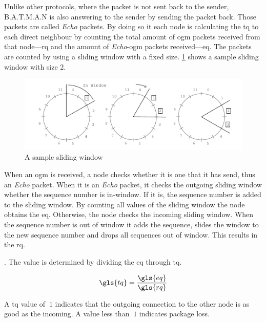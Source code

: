 Unlike other protocols, where the packet is not sent back to the sender, B.A.T.M.A.N is also answering to the sender by sending the packet back. Those packets are called \textit{Echo} packets. By doing so it each node is calculating the \gls{tq} to each direct neighbour by counting the total amount of \gls{ogm} packets received from that node—\gls{rq} and the amount of \textit{Echo}-\gls{ogm} packets received—\gls{eq}. 
The packets are counted by using a sliding window \cite[\S3.4]{tanenbaum_wetherall_2011} with a fixed size. \cref{fig:sliding-window} shows a sample sliding window with size 2. 

\begin{figure}
\centering
\includegraphics[width=1\textwidth]{graphics/sliding-window.pdf}
\caption{A sample sliding window}
\label{fig:sliding-window}
\end{figure}

When an \gls{ogm} is received, a node checks whether it is one that it has send, thus an \textit{Echo} packet. When it is an \textit{Echo} packet, it checks the outgoing sliding window whether the sequence number is in-window. If it is, the sequence number is added to the sliding window. By counting all values of the sliding window the node obtains the \gls{eq}. 
Otherwise, the node checks the incoming sliding window. When the sequence number is out of window it adds the sequence, slides the window to the new sequence number and drops all sequences out of window. This results in the \gls{rq}.

\cite[\S2.3.3]{tobias_hardes}. The value is determined by dividing the \gls{eq} through \gls{tq}.

\begin{equation}
\label{eq:transmit_quality}
\gls{tq} = \frac{\gls{eq}}{\gls{rq}}
\end{equation}

A \gls{tq} value of $\ 1 $ indicates that the outgoing connection to the other node is as good as the incoming. A value less than $\ 1 $ indicates package loss.

